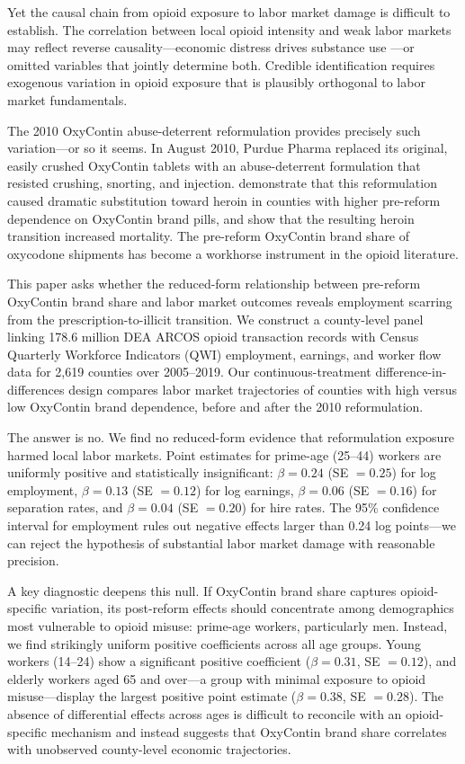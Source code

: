 \documentclass[12pt]{article}
\begin{document}
Yet the causal chain from opioid exposure to labor market damage is difficult to establish. The correlation between local opioid intensity and weak labor markets may reflect reverse causality---economic distress drives substance use \citep{case2015, case2017}---or omitted variables that jointly determine both. Credible identification requires exogenous variation in opioid exposure that is plausibly orthogonal to labor market fundamentals.

The 2010 OxyContin abuse-deterrent reformulation provides precisely such variation---or so it seems. In August 2010, Purdue Pharma replaced its original, easily crushed OxyContin tablets with an abuse-deterrent formulation that resisted crushing, snorting, and injection. \citet{alpert2018} demonstrate that this reformulation caused dramatic substitution toward heroin in counties with higher pre-reform dependence on OxyContin brand pills, and \citet{evans2019} show that the resulting heroin transition increased mortality. The pre-reform OxyContin brand share of oxycodone shipments has become a workhorse instrument in the opioid literature.

This paper asks whether the reduced-form relationship between pre-reform OxyContin brand share and labor market outcomes reveals employment scarring from the prescription-to-illicit transition. We construct a county-level panel linking 178.6 million DEA ARCOS opioid transaction records with Census Quarterly Workforce Indicators (QWI) employment, earnings, and worker flow data for 2,619 counties over 2005--2019. Our continuous-treatment difference-in-differences design compares labor market trajectories of counties with high versus low OxyContin brand dependence, before and after the 2010 reformulation.

The answer is no. We find no reduced-form evidence that reformulation exposure harmed local labor markets. Point estimates for prime-age (25--44) workers are uniformly positive and statistically insignificant: $\beta = 0.24$ (SE $= 0.25$) for log employment, $\beta = 0.13$ (SE $= 0.12$) for log earnings, $\beta = 0.06$ (SE $= 0.16$) for separation rates, and $\beta = 0.04$ (SE $= 0.20$) for hire rates. The 95\% confidence interval for employment rules out negative effects larger than 0.24 log points---we can reject the hypothesis of substantial labor market damage with reasonable precision.

A key diagnostic deepens this null. If OxyContin brand share captures opioid-specific variation, its post-reform effects should concentrate among demographics most vulnerable to opioid misuse: prime-age workers, particularly men. Instead, we find strikingly uniform positive coefficients across all age groups. Young workers (14--24) show a significant positive coefficient ($\beta = 0.31$, SE $= 0.12$), and elderly workers aged 65 and over---a group with minimal exposure to opioid misuse---display the largest positive point estimate ($\beta = 0.38$, SE $= 0.28$). The absence of differential effects across ages is difficult to reconcile with an opioid-specific mechanism and instead suggests that OxyContin brand share correlates with unobserved county-level economic trajectories.
\end{document}
